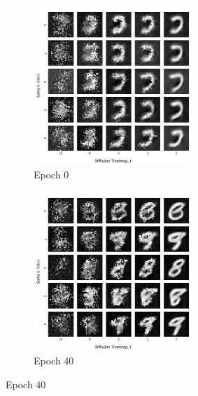 \documentclass[12pt]{article}
\begin{document}
\begin{figure}[hp]
    \begin{subfigure}{0.49\textwidth}
    \includegraphics[width=0.9\linewidth, height=6cm, center]{figures/diffusion_plot_10_0000}
    \caption{Epoch 0}
    \label{fig:10_0}
    \end{subfigure}
    \begin{subfigure}{0.49\textwidth}
    \includegraphics[width=0.9\linewidth, height=6cm, center]{figures/diffusion_plot_10_0040.png}
    \caption{Epoch 40}
    \label{fig:10_40}
    \end{subfigure}


\end{figure}
\end{document}
